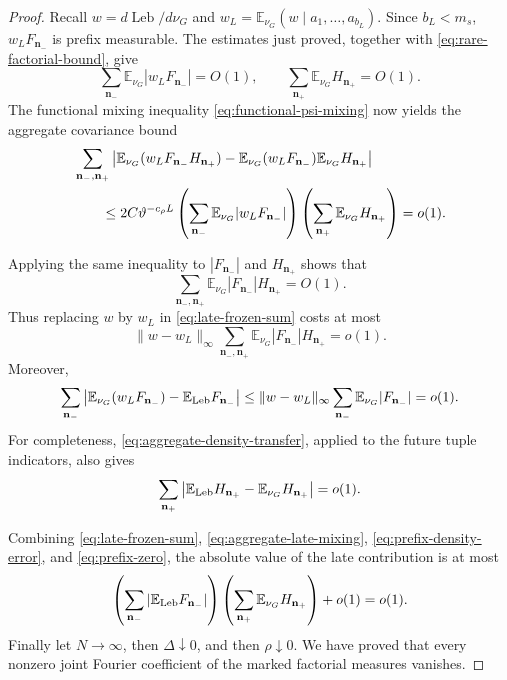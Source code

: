 \documentclass[11pt]{article}
\numberwithin{equation}{section}
\theoremstyle{definition}
\newcommand{\E}{\mathbb E}
\newcommand{\1}{\mathbf 1}
\newcommand{\Leb}{\operatorname{Leb}}
\begin{document}
\begin{proof}
Recall \(w=d\Leb/d\nu_G\) and
\(w_L=\E_{\nu_G}(w\mid a_1,\ldots,a_{b_L})\).  Since \(b_L<m_s\),
\(w_LF_{\mathbf n_-}\) is prefix measurable.  The estimates just
proved, together with \eqref{eq:rare-factorial-bound}, give
\[
 \sum_{\mathbf n_-}\E_{\nu_G}|w_LF_{\mathbf n_-}|=O(1),
 \qquad
 \sum_{\mathbf n_+}\E_{\nu_G}H_{\mathbf n_+}=O(1).
\]
The functional mixing inequality
\eqref{eq:functional-psi-mixing} now yields the aggregate covariance
bound
\begin{align}
 &\sum_{\mathbf n_-,\mathbf n_+}
 \left|
 \E_{\nu_G}(w_LF_{\mathbf n_-}H_{\mathbf n_+})
 -\E_{\nu_G}(w_LF_{\mathbf n_-})
  \E_{\nu_G}H_{\mathbf n_+}
 \right| \notag\\
 &\qquad\le
 2C\vartheta^{-c_\rho L}
 \left(\sum_{\mathbf n_-}
       \E_{\nu_G}|w_LF_{\mathbf n_-}|\right)
 \left(\sum_{\mathbf n_+}
       \E_{\nu_G}H_{\mathbf n_+}\right)
 =o(1).
 \label{eq:aggregate-late-mixing}
\end{align}

Applying the same inequality to \(|F_{\mathbf n_-}|\) and
\(H_{\mathbf n_+}\) shows that
\[
 \sum_{\mathbf n_-,\mathbf n_+}
 \E_{\nu_G}|F_{\mathbf n_-}|H_{\mathbf n_+}=O(1).
\]
Thus replacing \(w\) by \(w_L\) in
\eqref{eq:late-frozen-sum} costs at most
\[
 \|w-w_L\|_\infty
 \sum_{\mathbf n_-,\mathbf n_+}
 \E_{\nu_G}|F_{\mathbf n_-}|H_{\mathbf n_+}=o(1).
\]
Moreover,
\begin{equation}\label{eq:prefix-density-error}
 \sum_{\mathbf n_-}
 \left|
 \E_{\nu_G}(w_LF_{\mathbf n_-})
 -\E_{\rm Leb}F_{\mathbf n_-}
 \right|
 \le
 \|w-w_L\|_\infty
 \sum_{\mathbf n_-}\E_{\nu_G}|F_{\mathbf n_-}|
 =o(1).
\end{equation}
For completeness,
\eqref{eq:aggregate-density-transfer}, applied to the future tuple
indicators, also gives
\begin{equation}\label{eq:future-density-error}
 \sum_{\mathbf n_+}
 \left|
 \E_{\rm Leb}H_{\mathbf n_+}
 -\E_{\nu_G}H_{\mathbf n_+}
 \right|=o(1).
\end{equation}

Combining
\eqref{eq:late-frozen-sum},
\eqref{eq:aggregate-late-mixing},
\eqref{eq:prefix-density-error}, and
\eqref{eq:prefix-zero}, the absolute value of the late contribution is
at most
\[
 \left(\sum_{\mathbf n_-}
       |\E_{\rm Leb}F_{\mathbf n_-}|\right)
 \left(\sum_{\mathbf n_+}
       \E_{\nu_G}H_{\mathbf n_+}\right)+o(1)
 =o(1).
\]
Finally let \(N\to\infty\), then \(\Delta\downarrow0\), and then
\(\rho\downarrow0\).  We have proved that every nonzero joint Fourier
coefficient of the marked factorial measures vanishes.


\end{proof}
\end{document}
